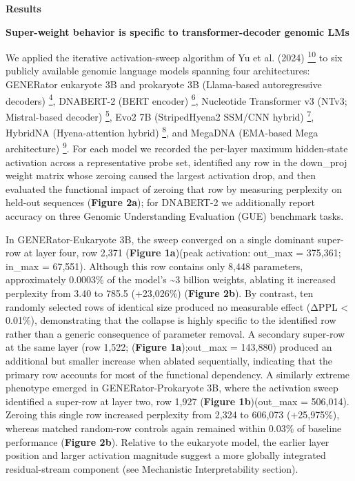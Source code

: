 \documentclass[11pt]{article}
\begin{document}
\textbf{Results}

\textbf{Super-weight behavior is specific to transformer-decoder genomic
LMs}

We applied the iterative activation-sweep algorithm of Yu et al. (2024)
\href{https://paperpile.com/c/FLFbSd/h0C1}{\textsuperscript{10}} to six
publicly available genomic language models spanning four architectures:
GENERator eukaryote 3B and prokaryote 3B (Llama-based autoregressive
decoders)
\href{https://paperpile.com/c/FLFbSd/wsei}{\textsuperscript{4}},
DNABERT-2 (BERT encoder)
\href{https://paperpile.com/c/FLFbSd/5VVM}{\textsuperscript{6}},
Nucleotide Transformer v3 (NTv3; Mistral-based decoder)
\href{https://paperpile.com/c/FLFbSd/zg9K}{\textsuperscript{5}}, Evo2 7B
(StripedHyena2 SSM/CNN hybrid)
\href{https://paperpile.com/c/FLFbSd/j27Z}{\textsuperscript{7}},
HybridNA (Hyena-attention hybrid)
\href{https://paperpile.com/c/FLFbSd/HqTS}{\textsuperscript{8}}, and
MegaDNA (EMA-based Mega architecture)
\href{https://paperpile.com/c/FLFbSd/0vKI}{\textsuperscript{9}}. For
each model we recorded the per-layer maximum hidden-state activation
across a representative probe set, identified any row in the down\_proj
weight matrix whose zeroing caused the largest activation drop, and then
evaluated the functional impact of zeroing that row by measuring
perplexity on held-out sequences (\textbf{Figure 2a}); for DNABERT-2 we
additionally report accuracy on three Genomic Understanding Evaluation
(GUE) benchmark tasks.

In GENERator-Eukaryote 3B, the sweep converged on a single dominant
super-row at layer four, row 2,371 (\textbf{Figure 1a})(peak activation:
out\_max = 375,361; in\_max = 67,551). Although this row contains only
8,448 parameters, approximately 0.0003\% of the model's \textasciitilde3
billion weights, ablating it increased perplexity from 3.40 to 785.5
(+23,026\%) (\textbf{Figure 2b}). By contrast, ten randomly selected
rows of identical size produced no measurable effect (ΔPPL \textless{}
0.01\%), demonstrating that the collapse is highly specific to the
identified row rather than a generic consequence of parameter removal. A
secondary super-row at the same layer (row 1,522; (\textbf{Figure
1a});out\_max = 143,880) produced an additional but smaller increase
when ablated sequentially, indicating that the primary row accounts for
most of the functional dependency. A similarly extreme phenotype emerged
in GENERator-Prokaryote 3B, where the activation sweep identified a
super-row at layer two, row 1,927 (\textbf{Figure 1b})(out\_max =
506,014). Zeroing this single row increased perplexity from 2,324 to
606,073 (+25,975\%), whereas matched random-row controls again remained
within 0.03\% of baseline performance (\textbf{Figure 2b}). Relative to
the eukaryote model, the earlier layer position and larger activation
magnitude suggest a more globally integrated residual-stream component
(see Mechanistic Interpretability section).
\end{document}
